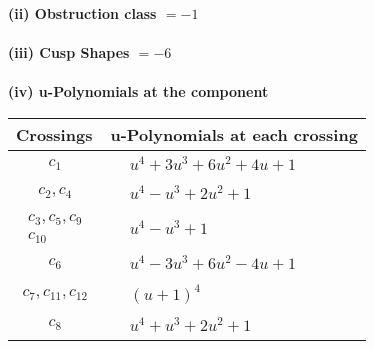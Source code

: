 \documentclass[1p]{elsarticle_modified}
\theoremstyle{definition}
\begin{document}
\flushleft \textbf{(ii) Obstruction class $= -1$}\\~\\
\flushleft \textbf{(iii) Cusp Shapes $= -6$}\\~\\
\newpage\renewcommand{\arraystretch}{1}
\flushleft \textbf{(iv) u-Polynomials at the component}\newline \\
\begin{tabular}{m{50pt}|m{274pt}}
Crossings & \hspace{64pt}u-Polynomials at each crossing \\
\hline $$\begin{aligned}c_{1}\end{aligned}$$&$\begin{aligned}
&u^4+3 u^3+6 u^2+4 u+1
\end{aligned}$\\
\hline $$\begin{aligned}c_{2},c_{4}\end{aligned}$$&$\begin{aligned}
&u^4- u^3+2 u^2+1
\end{aligned}$\\
\hline $$\begin{aligned}c_{3},c_{5},c_{9}\\c_{10}\end{aligned}$$&$\begin{aligned}
&u^4- u^3+1
\end{aligned}$\\
\hline $$\begin{aligned}c_{6}\end{aligned}$$&$\begin{aligned}
&u^4-3 u^3+6 u^2-4 u+1
\end{aligned}$\\
\hline $$\begin{aligned}c_{7},c_{11},c_{12}\end{aligned}$$&$\begin{aligned}
&(u+1)^4
\end{aligned}$\\
\hline $$\begin{aligned}c_{8}\end{aligned}$$&$\begin{aligned}
&u^4+u^3+2 u^2+1
\end{aligned}$\\
\hline
\end{tabular}\\~\\
\end{document}
